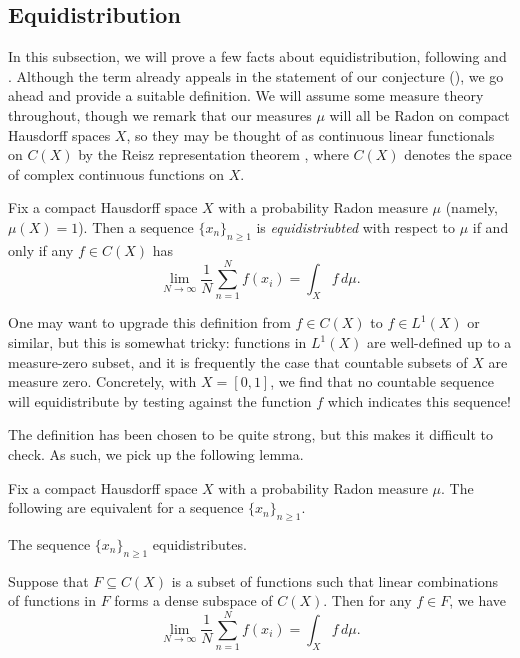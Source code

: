 \documentclass[../thesis.tex]{subfiles}
\begin{document}
\subsection{Equidistribution}
In this subsection, we will prove a few facts about equidistribution, following \cite[Section~2]{fite-intro-st} and \cite[Appendix to Chapter~I]{serre-l-adic-reps}. Although the term already appeals in the statement of our conjecture (), we go ahead and provide a suitable definition. We will assume some measure theory throughout, though we remark that our measures $\mu$ will all be Radon on compact Hausdorff spaces $X$, so they may be thought of as continuous linear functionals on $C(X)$ by the Reisz representation theorem \cite[Theorem~7.2]{folland-real-analysis}, where $C(X)$ denotes the space of complex continuous functions on $X$.
\begin{definition}[equidistributed]
	Fix a compact Hausdorff space $X$ with a probability Radon measure $\mu$ (namely, $\mu(X)=1$). Then a sequence $\{x_n\}_{n\ge1}$ is \textit{equidistriubted} with respect to $\mu$ if and only if any $f\in C(X)$ has
	\[\lim_{N\to\infty}\frac1N\sum_{n=1}^Nf(x_i)=\int_Xf\,d\mu.\]
\end{definition}
\begin{remark}
	One may want to upgrade this definition from $f\in C(X)$ to $f\in L^1(X)$ or similar, but this is somewhat tricky: functions in $L^1(X)$ are well-defined up to a measure-zero subset, and it is frequently the case that countable subsets of $X$ are measure zero. Concretely, with $X=[0,1]$, we find that no countable sequence will equidistribute by testing against the function $f$ which indicates this sequence!
\end{remark}
The definition has been chosen to be quite strong, but this makes it difficult to check. As such, we pick up the following lemma.
\begin{lemma} \label{lem:equi-by-dense}
	Fix a compact Hausdorff space $X$ with a probability Radon measure $\mu$. The following are equivalent for a sequence $\{x_n\}_{n\ge1}$.
	\begin{listroman}
		\item The sequence $\{x_n\}_{n\ge1}$ equidistributes.
		\item Suppose that $F\subseteq C(X)$ is a subset of functions such that linear combinations of functions in $F$ forms a dense subspace of $C(X)$. Then for any $f\in F$, we have
		\[\lim_{N\to\infty}\frac1N\sum_{n=1}^Nf(x_i)=\int_Xf\,d\mu.\]
	\end{listroman}
\end{lemma}
\end{document}
